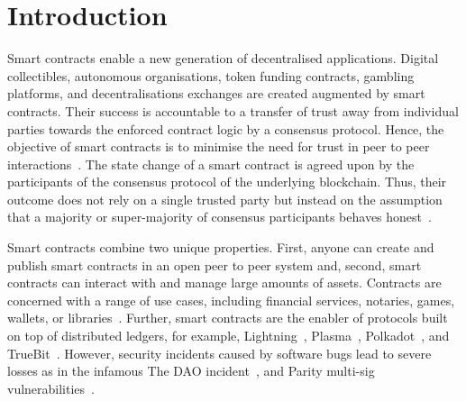 \section{Introduction}
Smart contracts enable a new generation of decentralised applications.
Digital collectibles, autonomous organisations, token funding contracts, gambling platforms, and decentralisations exchanges are created augmented by smart contracts.
Their success is accountable to a transfer of trust away from individual parties towards the enforced contract logic by a consensus protocol.
Hence, the objective of smart contracts is to minimise the need for trust in peer to peer interactions~\cite{Szabo1997}.
The state change of a smart contract is agreed upon by the participants of the consensus protocol of the underlying blockchain.
Thus, their outcome does not rely on a single trusted party but instead on the assumption that a majority or super-majority of consensus participants behaves honest~\cite{Nakamoto2008,Eyal2014}.

Smart contracts combine two unique properties. 
First, anyone can create and publish smart contracts in an open peer to peer system and, second, smart contracts can interact with and manage large amounts of assets.
Contracts are concerned with a range of use cases, including financial services, notaries, games, wallets, or libraries~\cite{Bartoletti2017}.
Further, smart contracts are the enabler of protocols built on top of distributed ledgers, for example, Lightning~\cite{Poon2016}, Plasma~\cite{Poon2017}, Polkadot~\cite{Wood2017}, and TrueBit~\cite{Teutsch2017}.
However, security incidents caused by software bugs lead to severe losses as in the infamous The DAO incident~\cite{Daian2016}, and Parity multi-sig vulnerabilities~\cite{Breidenbach2017Parity,ParityTech2017}. 

